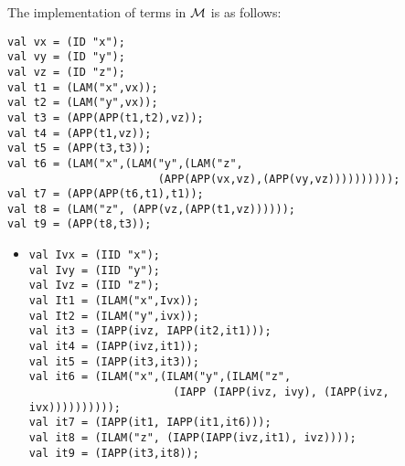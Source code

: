 \documentclass[11pt]{article}
\newcommand \cM {\cal M}
\begin{document}
\begin{enumerate}
	      
	      \noindent
	      The implementation of terms in $\cM$ is as follows:
	      \begin{verbatim}
val vx = (ID "x");
val vy = (ID "y");
val vz = (ID "z");
val t1 = (LAM("x",vx));
val t2 = (LAM("y",vx));
val t3 = (APP(APP(t1,t2),vz));
val t4 = (APP(t1,vz));
val t5 = (APP(t3,t3));
val t6 = (LAM("x",(LAM("y",(LAM("z",
                       (APP(APP(vx,vz),(APP(vy,vz))))))))));
val t7 = (APP(APP(t6,t1),t1));
val t8 = (LAM("z", (APP(vz,(APP(t1,vz))))));
val t9 = (APP(t8,t3));
	      \end{verbatim}
	      \color{red}
	      
	      \begin{itemize}
	      	\item
	      	      \begin{verbatim}
val Ivx = (IID "x");
val Ivy = (IID "y");
val Ivz = (IID "z");
val It1 = (ILAM("x",Ivx));
val It2 = (ILAM("y",ivx));
val it3 = (IAPP(ivz, IAPP(it2,it1)));
val it4 = (IAPP(ivz,it1));
val it5 = (IAPP(it3,it3));
val it6 = (ILAM("x",(ILAM("y",(ILAM("z",
                      (IAPP (IAPP(ivz, ivy), (IAPP(ivz, ivx))))))))));
val it7 = (IAPP(it1, IAPP(it1,it6))); 
val it8 = (ILAM("z", (IAPP(IAPP(ivz,it1), ivz))));
val it9 = (IAPP(it3,it8)); 
	      	      \end{verbatim}
	      	      

\end{itemize}
\end{enumerate}
\end{document}
